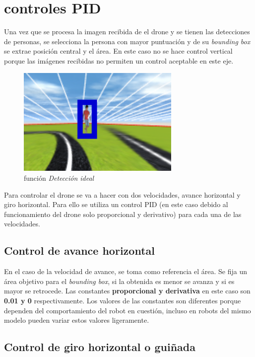 \section{controles PID}
Una vez que se procesa la imagen recibida de el drone y se tienen las detecciones de personas, se selecciona la persona con mayor puntuación y de su \textit{bounding box} se extrae posición central y el área. En este caso no se hace control vertical porque las imágenes recibidas no permiten un control aceptable en este eje.
\begin{figure}[H]
  \begin{center}
    \includegraphics[width=0.7\textwidth]{figures/simulado/sim3.png}
		\caption{función \textit{Detección ideal}}
		\label{fig:sim3}
		\end{center}
\end{figure}

Para controlar el drone se va a hacer con dos velocidades, avance horizontal y giro horizontal. Para ello se utiliza un control PID (en este caso debido al funcionamiento del drone solo proporcional y derivativo) para cada una de las velocidades.

\subsection*{Control de avance horizontal}

En el caso de la velocidad de avance, se toma como referencia el área. Se fija un área objetivo para el \textit{bounding box}, si la obtenida es menor se avanza y si es mayor se retrocede. Las constantes \textbf{proporcional y derivativa} en este caso son \textbf{0.01 y 0} respectivamente. Los valores de las constantes son diferentes porque dependen del comportamiento del robot en cuestión, incluso en robots del mismo modelo pueden variar estos valores ligeramente.

\subsection*{Control de giro horizontal o guiñada}

